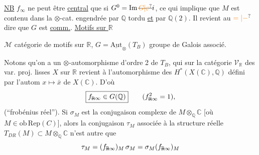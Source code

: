 

\uline{NB} $f_\infty$ ne peut être \uline{central} que si $G^0=\mathrm{Im}\,\deleted{\unsure{G|\varepsilon}}i$, ce qui
implique que $M$ est  contenu dans la
$\otimes$-cat. engendrée par $\mathbb Q$ tordu \uline{et} par $\mathbb Q(2)$.
Il revient au $\unsure{=|{-}}$ dire que $G$ est \uline{comm.}.
\uline{Motifs sur $\mathbb R$}

$\mathcal M$ \inserted{$\otimes$-}catégorie de motifs sur $\mathbb R$, $G=\underline{\mathrm{Aut}}_\otimes(T_B)$ groupe de Galois associé.

Notons qu'on a un $\otimes$-automorphisme d'ordre 2 de $T_B$,
qui sur la catégorie $\mathcal V_{\mathbb R}$ des var. proj. lisses $X$ sur $\mathbb R$
revient à l'automorphisme des $H^*(X(\mathbb C),\mathbb Q)$ défini par
l'autom $x\mapsto\bar x$ de $X(\mathbb C)$. D'où
\[
\boxed{f_{\deleted{\mathbb R}\infty}\in G(\mathbb Q)}\qquad(f_{\deleted{\mathbb R}\infty}^{2}=1),
\]
(``frobénius réel'').  Si $\sigma_M$ est la conjugaison
complexe de $M\otimes_{\mathbb Q}\mathbb C$ [où $M\in\mathrm{ob}\,\mathrm{Rep}(C)$], alors
la conjugaison $\tau_M$ associée à la structure réelle
$T_{DR}(M)\subset M\otimes_{\mathbb Q}\mathbb C$ n'est autre que
\[
\tau_M=(f_{\deleted{\mathbb R}\infty})_M\,\sigma_M
=\sigma_M(f_{\deleted{\mathbb R}\infty})_M
\]

